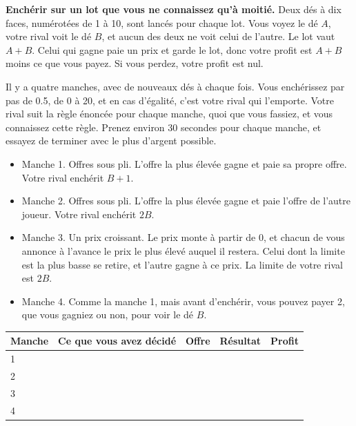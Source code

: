 \begin{question}\label{iq:iv2:played-games:3}
\textbf{Enchérir sur un lot que vous ne connaissez qu'à moitié.} Deux dés à dix faces, numérotées de 1 à 10, sont lancés pour chaque lot. Vous voyez le dé $A$, votre rival voit le dé $B$, et aucun des deux ne voit celui de l'autre. Le lot vaut $A + B$. Celui qui gagne paie un prix et garde le lot, donc votre profit est $A + B$ moins ce que vous payez. Si vous perdez, votre profit est nul.

Il y a quatre manches, avec de nouveaux dés à chaque fois. Vous enchérissez par pas de 0.5, de 0 à 20, et en cas d'égalité, c'est votre rival qui l'emporte. Votre rival suit la règle énoncée pour chaque manche, quoi que vous fassiez, et vous connaissez cette règle. Prenez environ 30 secondes pour chaque manche, et essayez de terminer avec le plus d'argent possible.
\begin{itemize}
\item Manche 1. Offres sous pli. L'offre la plus élevée gagne et paie sa propre offre. Votre rival enchérit $B + 1$.
\item Manche 2. Offres sous pli. L'offre la plus élevée gagne et paie l'offre de l'autre joueur. Votre rival enchérit $2B$.
\item Manche 3. Un prix croissant. Le prix monte à partir de 0, et chacun de vous annonce à l'avance le prix le plus élevé auquel il restera. Celui dont la limite est la plus basse se retire, et l'autre gagne à ce prix. La limite de votre rival est $2B$.
\item Manche 4. Comme la manche 1, mais avant d'enchérir, vous pouvez payer 2, que vous gagniez ou non, pour voir le dé $B$.
\end{itemize}

\medskip
\begin{tabular}{@{}l|p{5.5cm}|l|l|l@{}}
Manche & Ce que vous avez décidé & Offre & Résultat & Profit \\ \hline
1 & & & & \\[8pt]\hline
2 & & & & \\[8pt]\hline
3 & & & & \\[8pt]\hline
4 & & & & \\[8pt]\hline
\end{tabular}
\end{question}
\vfill\clearpage


